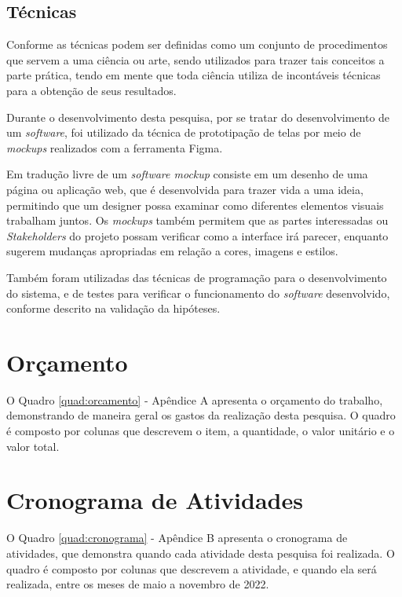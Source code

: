 \subsection{Técnicas}

Conforme \citep[p. 174]{LAKATOS2003:metodologia} as técnicas podem
ser definidas como um conjunto de procedimentos que servem a
uma ciência ou arte, sendo utilizados para trazer tais
conceitos a parte prática, tendo em mente que toda ciência utiliza
de incontáveis técnicas para a obtenção de seus resultados.

Durante o desenvolvimento desta pesquisa, por se tratar do
desenvolvimento de um \emph{software}, foi utilizado da técnica
de prototipação de telas por meio de \emph{mockups} realizados
com a ferramenta Figma.

Em tradução livre de \cite{uzayr:mockups} um \emph{software mockup}
consiste em um desenho de uma página ou aplicação web,
que é desenvolvida para trazer vida a uma ideia, permitindo
que um designer possa examinar como diferentes elementos visuais
trabalham juntos. Os \emph{mockups} também permitem que as partes
interessadas ou \emph{Stakeholders} do projeto possam verificar como a
interface irá parecer, enquanto sugerem mudanças
apropriadas em relação a cores, imagens e estilos.

Também foram utilizadas das técnicas de programação para o desenvolvimento
do sistema, e de testes para verificar o funcionamento do \emph{software}
desenvolvido, conforme descrito na validação da hipóteses.

\section{Orçamento} \label{sec:budget}

O Quadro \ref*{quad:orcamento} - Apêndice A apresenta o orçamento do trabalho,
demonstrando de maneira geral os gastos da realização desta pesquisa. O quadro
é composto por colunas que descrevem o item, a quantidade, o valor unitário e
o valor total.

\section{Cronograma de Atividades} \label{sec:schedule_activities_table}

O Quadro \ref*{quad:cronograma} - Apêndice B apresenta o cronograma de
atividades, que demonstra quando cada atividade desta pesquisa foi realizada.
O quadro é composto por colunas que descrevem a atividade, e quando ela será
realizada, entre os meses de maio a novembro de 2022.